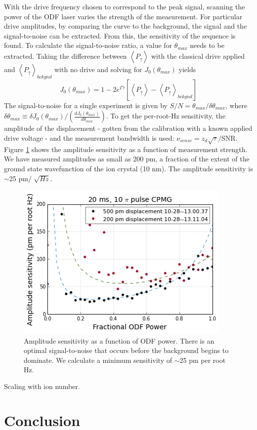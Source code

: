 \documentclass[aps,prl,twocolumn,groupedaddress,floatfix]{revtex4-1}
\begin{document}
With the drive frequency chosen to correspond to the peak signal, scanning the power of the ODF laser varies the strength of the measurement. For particular drive amplitudes, by comparing the curve to the background, the signal and the signal-to-noise can be extracted. From this, the sensitivity of the sequence is found. To calculate the signal-to-noise ratio, a value for $\theta_{max}$ needs to be extracted. Taking the difference between $\left< P_{\uparrow} \right>$ with the classical drive applied and $\left< P_{\uparrow} \right>_{bckgnd}$ with no drive and solving for $J_0(\theta_{max})$ yields
\[J_0(\theta_{max}) = 1 - 2e^{\Gamma \tau} \left[ \left< P_{\uparrow} \right> - \left< P_{\uparrow} \right>_{bckgnd} \right] \]
The signal-to-noise for a single experiment is given by $S/N =\theta_{max}/\delta \theta_{max}$, where $\delta \theta_{max} \equiv \delta J_0(\theta_{max})/ \left( \frac{dJ_0(\theta_{max})}{d\theta_{max}} \right)$. To get the per-root-Hz sensitivity, the amplitude of the displacement - gotten from the calibration with a known applied drive voltage - and the measurement bandwidth is used: $\nu_{sense} = z_d\sqrt{\tau}/$SNR. Figure \ref{Fig 4} shows the amplitude sensitivity as a function of measurement strength. We have measured amplitudes as small as 200 pm, a fraction of the extent of the ground state wavefunction of the ion crystal (10 nm). The amplitude sensitivity is $\sim$25 pm/ $ \sqrt{Hz}$.
\begin{figure}[h]
\includegraphics[width=.25\textwidth]{amp_sense_both}
\caption{Amplitude sensitivity as a function of ODF power. There is an optimal signal-to-noise that occurs before the background begins to dominate. We calculate a minimum sensitivity of $\sim$25 pm per root Hz.}\label{Fig 4}
\end{figure}
Scaling with ion number.

\section{Conclusion}

\subsection{}
\subsubsection{}
\end{document}
